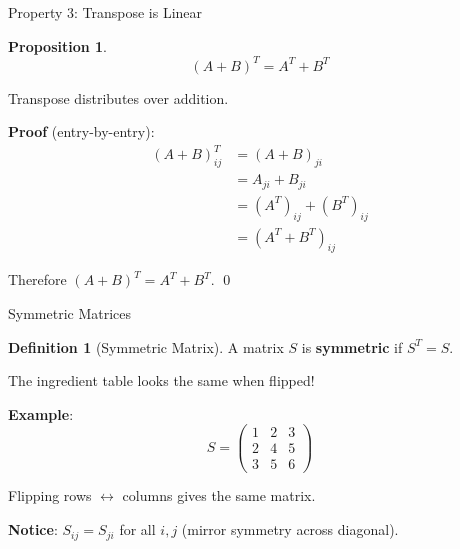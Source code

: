 \documentclass[10pt]{beamer}
\theoremstyle{definition}
\newtheorem{defi}{Definition}[section]
\newtheorem{prop}{Proposition}[section]
\newcommand{\x}[1]{\alert{\textbf{#1}}}
\begin{document}
\begin{frame}{Property 3: Transpose is Linear}

\begin{prop}
$$(A + B)^T = A^T + B^T$$

Transpose distributes over addition.
\end{prop}

\vspace{1em}

\x{Proof} (entry-by-entry):
\begin{align*}
(A + B)^T_{ij} &= (A + B)_{ji} \\
&= A_{ji} + B_{ji} \\
&= (A^T)_{ij} + (B^T)_{ij} \\
&= (A^T + B^T)_{ij}
\end{align*}

Therefore $(A + B)^T = A^T + B^T$. \qed

\end{frame}

\begin{frame}{Symmetric Matrices}

\begin{defi}[Symmetric Matrix]
A matrix $S$ is \x{symmetric} if $S^T = S$.

The ingredient table looks the same when flipped!
\end{defi}

\vspace{1em}

\x{Example}:
$$S = \begin{pmatrix} 1 & 2 & 3 \\ 2 & 4 & 5 \\ 3 & 5 & 6 \end{pmatrix}$$

Flipping rows $\leftrightarrow$ columns gives the same matrix.

\vspace{1em}

\x{Notice}: $S_{ij} = S_{ji}$ for all $i, j$ (mirror symmetry across diagonal).

\end{frame}
\end{document}
